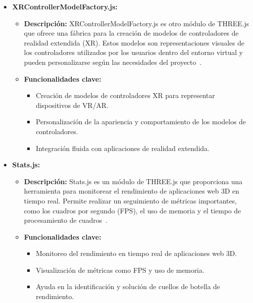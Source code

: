 \documentclass[a4paper, 12pt]{book}
\begin{document}
\begin{itemize}
  \item \textbf{XRControllerModelFactory.js:}
    \begin{itemize}
      \item \textbf{Descripción:} XRControllerModelFactory.js es otro módulo de THREE.js que ofrece una fábrica para la creación de modelos de controladores de 
      realidad extendida (XR). Estos modelos son representaciones visuales de los controladores utilizados por los usuarios dentro del entorno virtual y pueden 
      personalizarse según las necesidades del proyecto~\cite{Documentacion_WebXR}.
      \item \textbf{Funcionalidades clave:}
      \begin{itemize}
        \item Creación de modelos de controladores XR para representar dispositivos de VR/AR.
        \item Personalización de la apariencia y comportamiento de los modelos de controladores.
        \item Integración fluida con aplicaciones de realidad extendida.
      \end{itemize}
    \end{itemize}
  
  \item \textbf{Stats.js:}
    \begin{itemize}
      \item \textbf{Descripción:} Stats.js es un módulo de THREE.js que proporciona una herramienta para monitorear el rendimiento de aplicaciones web 3D en tiempo real. 
      Permite realizar un seguimiento de métricas importantes, como los cuadros por segundo (FPS), el uso de memoria y el tiempo de procesamiento de cuadros~\cite{Statsjs}.
      \item \textbf{Funcionalidades clave:}
      \begin{itemize}
        \item Monitoreo del rendimiento en tiempo real de aplicaciones web 3D.
        \item Visualización de métricas como FPS y uso de memoria.
        \item Ayuda en la identificación y solución de cuellos de botella de rendimiento.
      \end{itemize}
    \end{itemize}
  

\end{itemize}
\end{document}
